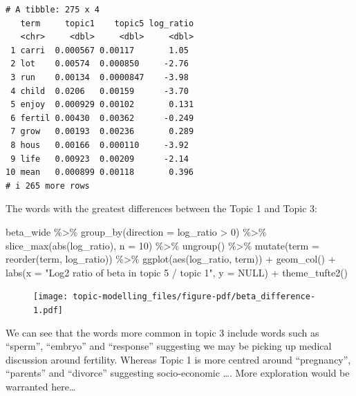 \documentclass[
  letterpaper,
  DIV=11,
  numbers=noendperiod]{scrreprt}
\newenvironment{Shaded}{\begin{snugshade}}{\end{snugshade}}
\newcommand{\AttributeTok}[1]{\textcolor[rgb]{0.40,0.45,0.13}{#1}}
\newcommand{\ConstantTok}[1]{\textcolor[rgb]{0.56,0.35,0.01}{#1}}
\newcommand{\DecValTok}[1]{\textcolor[rgb]{0.68,0.00,0.00}{#1}}
\newcommand{\FunctionTok}[1]{\textcolor[rgb]{0.28,0.35,0.67}{#1}}
\newcommand{\NormalTok}[1]{\textcolor[rgb]{0.00,0.23,0.31}{#1}}
\newcommand{\SpecialCharTok}[1]{\textcolor[rgb]{0.37,0.37,0.37}{#1}}
\newcommand{\StringTok}[1]{\textcolor[rgb]{0.13,0.47,0.30}{#1}}
\begin{document}
\begin{verbatim}
# A tibble: 275 x 4
   term     topic1    topic5 log_ratio
   <chr>     <dbl>     <dbl>     <dbl>
 1 carri  0.000567 0.00117       1.05 
 2 lot    0.00574  0.000850     -2.76 
 3 run    0.00134  0.0000847    -3.98 
 4 child  0.0206   0.00159      -3.70 
 5 enjoy  0.000929 0.00102       0.131
 6 fertil 0.00430  0.00362      -0.249
 7 grow   0.00193  0.00236       0.289
 8 hous   0.00166  0.000110     -3.92 
 9 life   0.00923  0.00209      -2.14 
10 mean   0.000899 0.00118       0.396
# i 265 more rows
\end{verbatim}

The words with the greatest differences between the Topic 1 and Topic 3:

\begin{Shaded}
\begin{Highlighting}[]
\NormalTok{beta\_wide }\SpecialCharTok{\%\textgreater{}\%}
  \FunctionTok{group\_by}\NormalTok{(}\AttributeTok{direction =}\NormalTok{ log\_ratio }\SpecialCharTok{\textgreater{}} \DecValTok{0}\NormalTok{) }\SpecialCharTok{\%\textgreater{}\%}
  \FunctionTok{slice\_max}\NormalTok{(}\FunctionTok{abs}\NormalTok{(log\_ratio), }\AttributeTok{n =} \DecValTok{10}\NormalTok{) }\SpecialCharTok{\%\textgreater{}\%} 
  \FunctionTok{ungroup}\NormalTok{() }\SpecialCharTok{\%\textgreater{}\%}
  \FunctionTok{mutate}\NormalTok{(}\AttributeTok{term =} \FunctionTok{reorder}\NormalTok{(term, log\_ratio)) }\SpecialCharTok{\%\textgreater{}\%}
  \FunctionTok{ggplot}\NormalTok{(}\FunctionTok{aes}\NormalTok{(log\_ratio, term)) }\SpecialCharTok{+}
  \FunctionTok{geom\_col}\NormalTok{() }\SpecialCharTok{+}
  \FunctionTok{labs}\NormalTok{(}\AttributeTok{x =} \StringTok{"Log2 ratio of beta in topic 5 / topic 1"}\NormalTok{, }\AttributeTok{y =} \ConstantTok{NULL}\NormalTok{) }\SpecialCharTok{+}
  \FunctionTok{theme\_tufte2}\NormalTok{()}
\end{Highlighting}
\end{Shaded}

\begin{figure}[H]

{\centering \texttt{[image: topic-modelling\_files/figure-pdf/beta\_difference-1.pdf]}

}

\end{figure}

We can see that the words more common in topic 3 include words such as
``sperm'', ``embryo'' and ``response'' suggesting we may be picking up
medical discussion around fertility. Whereas Topic 1 is more centred
around ``pregnancy'', ``parents'' and ``divorce'' suggesting
socio-economic \ldots. More exploration would be warranted here\ldots{}
\end{document}
